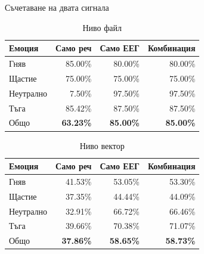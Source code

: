 \documentclass[9pt]{beamer}
\begin{document}
    \begin{frame}[t]{Съчетаване на двата сигнала}
        \begin{table}[h]
        \pause
        \begin{center}
            \begin{tabular}{|l|r r r|}
                \hline
                Емоция    & Само реч         & Само ЕЕГ         & Комбинация     \\
                \hline
                Гняв      & 85.00\%          & 80.00\%          & 80.00\%          \\
                Щастие    & 75.00\%          & 75.00\%          & 75.00\%          \\
                Неутрално & 7.50\%           & 97.50\%          & 97.50\%          \\
                Тъга      & 85.42\%          & 87.50\%          & 87.50\%          \\
                \hline
                \hline
                Общо      & \textbf{63.23\%} & \textbf{85.00\%} & \textbf{85.00\%} \\
                \hline
            \end{tabular}
            \caption*{Ниво файл}
        \end{center}
        \end{table}
        \pause
        \begin{table}[h]
            \begin{center}
                \begin{tabular}{|l|r r r|}
                    \hline
                    Емоция    & Само реч         & Само ЕЕГ         & Комбинация     \\
                    \hline
                    Гняв      & 41.53\%          & 53.05\%          & 53.30\%          \\
                    Щастие    & 37.35\%          & 44.44\%          & 44.09\%          \\
                    Неутрално & 32.91\%           & 66.72\%          & 66.46\%          \\
                    Тъга      & 39.66\%          & 70.38\%          & 71.07\%          \\
                    \hline
                    \hline
                    Общо      & \textbf{37.86\%} & \textbf{58.65\%} & \textbf{58.73\%} \\
                    \hline
                \end{tabular}
                \caption*{Ниво вектор}
            \end{center}
        \end{table}
    \end{frame}
\end{document}
